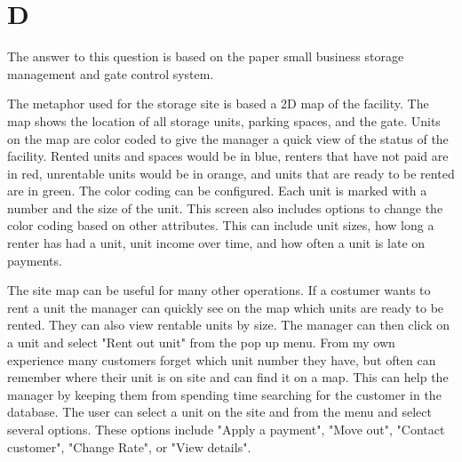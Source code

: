 \documentclass[12pt]{article}
\begin{document}
\section*{D}

The answer to this question is based on the paper small business storage 
management and gate control system.

The metaphor used for the storage site is based a 2D map of the facility.
The map shows the location of all storage units, parking spaces, and the 
gate.  Units on the map are color coded to give the manager a quick view
of the status of the facility.  Rented units and spaces would be in blue,
renters that have not paid are in red, unrentable units would be in orange,
and units that are ready to be rented are in green.  The color coding can
be configured.  Each unit is marked 
with a number and the size of the unit.  This screen also includes options
to change the color coding based on other attributes.  This can include 
unit sizes, how long a renter has had a unit, unit income over time, and
how often a unit is late on payments.

The site map can be useful for many other operations.  If a costumer wants 
to rent a unit the manager can quickly see on the map which units are ready
to be rented.  They can also view rentable units by size.  The manager can 
then click on a unit and select "Rent out unit" from the pop up menu.  From
my own experience many customers forget which unit number they have, but 
often
can remember where their unit is on site and can find it on a map.  This
can help the manager by keeping them from spending time searching for the
customer in the database.  The user can select a unit on the site and from
the menu and select several options.  These options include "Apply a
payment", "Move out", "Contact customer", "Change Rate", or "View details".
\end{document}
